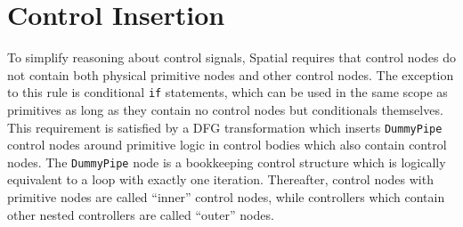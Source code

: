 




\section{Control Insertion}

To simplify reasoning about control signals, Spatial requires that control nodes do not contain both physical primitive nodes and other control nodes. The exception to this rule is conditional \texttt{\small{if}} statements, which can be used in the same scope as primitives as long as they contain no control nodes but conditionals themselves.
This requirement is satisfied by a DFG transformation which inserts \texttt{\small{DummyPipe}} control nodes around primitive logic in control bodies which also contain control nodes. The \texttt{\small{DummyPipe}} node is a bookkeeping control structure which is logically equivalent to a loop with exactly one iteration.
Thereafter, control nodes with primitive nodes are called ``inner'' control nodes, while controllers which contain other nested controllers are called ``outer'' nodes.

